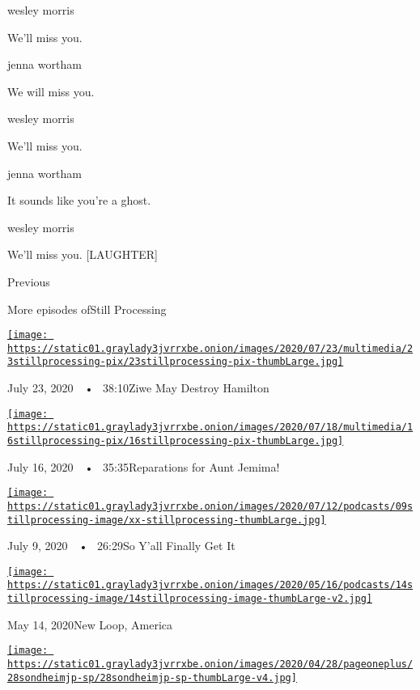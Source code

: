 wesley morris

We'll miss you.

jenna wortham

We will miss you.

wesley morris

We'll miss you.

jenna wortham

It sounds like you're a ghost.

wesley morris

We'll miss you. {[}LAUGHTER{]}

Previous

More episodes ofStill Processing

\href{https://www.nytimes3xbfgragh.onion/2020/07/23/podcasts/hamilton-ziwe-discomfort.html?action=click\&module=audio-series-bar\&region=header\&pgtype=Article}{\texttt{[image: https://static01.graylady3jvrrxbe.onion/images/2020/07/23/multimedia/23stillprocessing-pix/23stillprocessing-pix-thumbLarge.jpg]}}

July 23, 2020~~•~ 38:10Ziwe May Destroy Hamilton

\href{https://www.nytimes3xbfgragh.onion/2020/07/16/podcasts/reparations-for-aunt-jemima.html?action=click\&module=audio-series-bar\&region=header\&pgtype=Article}{\texttt{[image: https://static01.graylady3jvrrxbe.onion/images/2020/07/18/multimedia/16stillprocessing-pix/16stillprocessing-pix-thumbLarge.jpg]}}

July 16, 2020~~•~ 35:35Reparations for Aunt Jemima!

\href{https://www.nytimes3xbfgragh.onion/2020/07/09/podcasts/still-processing-black-lives-matter.html?action=click\&module=audio-series-bar\&region=header\&pgtype=Article}{\texttt{[image: https://static01.graylady3jvrrxbe.onion/images/2020/07/12/podcasts/09stillprocessing-image/xx-stillprocessing-thumbLarge.jpg]}}

July 9, 2020~~•~ 26:29So Y'all Finally Get It

\href{https://www.nytimes3xbfgragh.onion/2020/05/14/podcasts/still-processing-westworld-hollywood-utopia-dystopia.html?action=click\&module=audio-series-bar\&region=header\&pgtype=Article}{\texttt{[image: https://static01.graylady3jvrrxbe.onion/images/2020/05/16/podcasts/14stillprocessing-image/14stillprocessing-image-thumbLarge-v2.jpg]}}

May 14, 2020New Loop, America

\href{https://www.nytimes3xbfgragh.onion/2020/05/07/podcasts/still-processing-internet-vulnerability-sondheim-parks-recreation.html?action=click\&module=audio-series-bar\&region=header\&pgtype=Article}{\texttt{[image: https://static01.graylady3jvrrxbe.onion/images/2020/04/28/pageoneplus/28sondheimjp-sp/28sondheimjp-sp-thumbLarge-v4.jpg]}}

